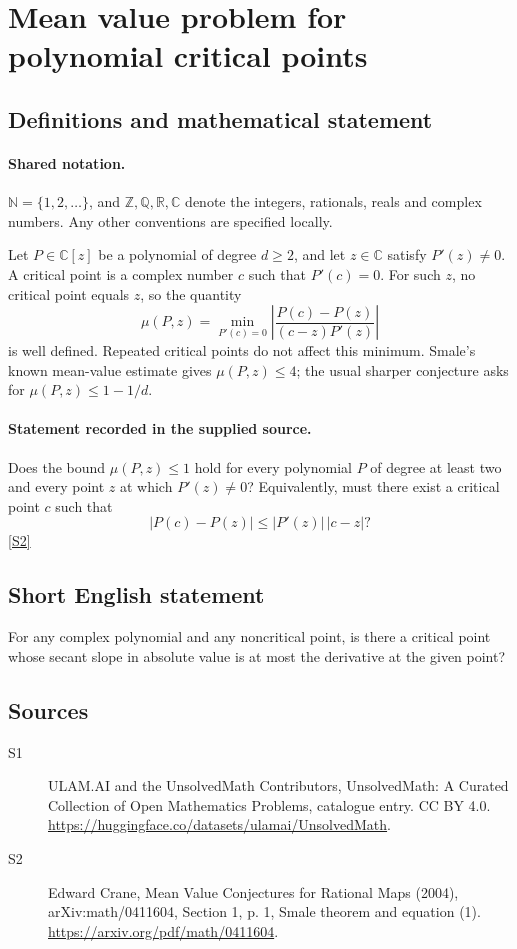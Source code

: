 \documentclass[11pt]{article}
\newcommand{\sref}[2]{\hyperlink{source:#1:#2}{[S#2]}}
\begin{document}
\section{Mean value problem for polynomial critical points}\label{statement}

\subsection{Definitions and mathematical statement}

\paragraph{Shared notation.}$\mathbb N=\{1,2,\ldots\}$, and $\mathbb Z,\mathbb Q,\mathbb R,\mathbb C$ denote the integers, rationals, reals and complex numbers. Any other conventions are specified locally.


Let \(P\in\mathbb C[z]\) be a polynomial of degree \(d\ge2\), and let \(z\in\mathbb C\) satisfy \(P'(z)\ne0\). A critical point is a complex number \(c\) such that \(P'(c)=0\). For such \(z\), no critical point equals \(z\), so the quantity
\[\mu(P,z)=\min_{P'(c)=0}\left|\frac{P(c)-P(z)}{(c-z)P'(z)}\right|\]
is well defined. Repeated critical points do not affect this minimum. Smale's known mean-value estimate gives \(\mu(P,z)\le4\); the usual sharper conjecture asks for \(\mu(P,z)\le1-1/d\).
\paragraph{Statement recorded in the supplied source.}
Does the bound \(\mu(P,z)\le1\) hold for every polynomial \(P\) of degree at least two and every point \(z\) at which \(P'(z)\ne0\)? Equivalently, must there exist a critical point \(c\) such that
\[|P(c)-P(z)|\le |P'(z)|\,|c-z|?\] \sref{statement}{2}
\subsection{Short English statement}
For any complex polynomial and any noncritical point, is there a critical point whose secant slope in absolute value is at most the derivative at the given point?
\subsection{Sources}
\begin{description}
\item[\hypertarget{source:statement:1}{S1}] ULAM.AI and the UnsolvedMath Contributors, UnsolvedMath: A Curated Collection of Open Mathematics Problems, catalogue entry. CC BY 4.0. \url{https://huggingface.co/datasets/ulamai/UnsolvedMath}.
\item[\hypertarget{source:statement:2}{S2}] Edward Crane, Mean Value Conjectures for Rational Maps (2004), arXiv:math/0411604, Section 1, p. 1, Smale theorem and equation (1). \url{https://arxiv.org/pdf/math/0411604}.
\end{description}
\label{end:statement}
\end{document}
